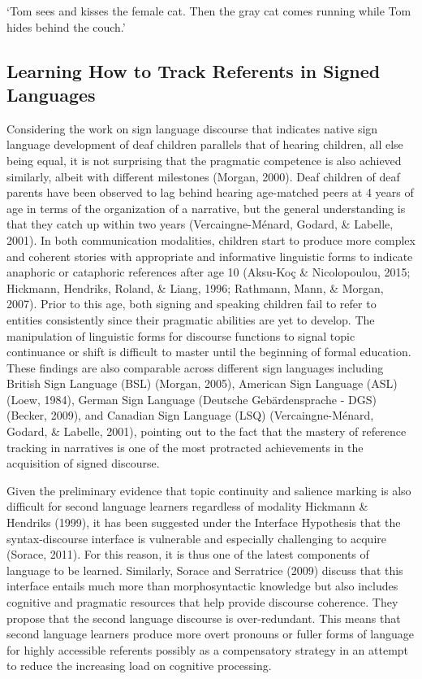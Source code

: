 \documentclass[
  english,
  doc,mask]{apa6}
\begin{document}
\begin{exe}
\begin{xlist}
\glt `Tom sees and kisses the female cat. Then the gray cat comes running while Tom hides behind the couch.'
\end{xlist}
\end{exe}

\hypertarget{learning-how-to-track-referents-in-signed-languages}{%
\subsection{Learning How to Track Referents in Signed Languages}\label{learning-how-to-track-referents-in-signed-languages}}

Considering the work on sign language discourse that indicates native sign language development of deaf children parallels that of hearing children, all else being equal, it is not surprising that the pragmatic competence is also achieved similarly, albeit with different milestones (Morgan, 2000). Deaf children of deaf parents have been observed to lag behind hearing age-matched peers at 4 years of age in terms of the organization of a narrative, but the general understanding is that they catch up within two years (Vercaingne-Ménard, Godard, \& Labelle, 2001). In both communication modalities, children start to produce more complex and coherent stories with appropriate and informative linguistic forms to indicate anaphoric or cataphoric references after age 10 (Aksu-Koç \& Nicolopoulou, 2015; Hickmann, Hendriks, Roland, \& Liang, 1996; Rathmann, Mann, \& Morgan, 2007). Prior to this age, both signing and speaking children fail to refer to entities consistently since their pragmatic abilities are yet to develop. The manipulation of linguistic forms for discourse functions to signal topic continuance or shift is difficult to master until the beginning of formal education. These findings are also comparable across different sign languages including British Sign Language (BSL) (Morgan, 2005), American Sign Language (ASL) (Loew, 1984), German Sign Language (Deutsche Gebärdensprache - DGS) (Becker, 2009), and Canadian Sign Language (LSQ) (Vercaingne-Ménard, Godard, \& Labelle, 2001), pointing out to the fact that the mastery of reference tracking in narratives is one of the most protracted achievements in the acquisition of signed discourse.

Given the preliminary evidence that topic continuity and salience marking is also difficult for second language learners regardless of modality Hickmann \& Hendriks (1999), it has been suggested under the Interface Hypothesis that the syntax-discourse interface is vulnerable and especially challenging to acquire (Sorace, 2011). For this reason, it is thus one of the latest components of language to be learned. Similarly, Sorace and Serratrice (2009) discuss that this interface entails much more than morphosyntactic knowledge but also includes cognitive and pragmatic resources that help provide discourse coherence. They propose that the second language discourse is over-redundant. This means that second language learners produce more overt pronouns or fuller forms of language for highly accessible referents possibly as a compensatory strategy in an attempt to reduce the increasing load on cognitive processing.
\end{document}
